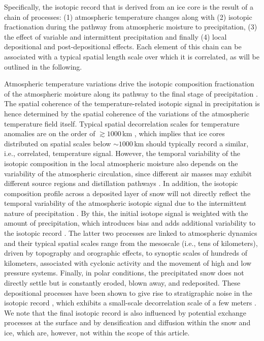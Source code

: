 \documentclass[draft]{agujournal2019}
\begin{document}
Specifically, the isotopic record that is derived from an ice core is the result
of a chain of processes: (1) atmospheric temperature changes along with (2) isotopic
fractionation during the pathway from atmospheric moisture to precipitation, (3)
the effect of variable and intermittent precipitation and finally (4) local
depositional and post-depositional effects. Each element of this chain can be
associated with a typical spatial length scale over which it is correlated, as
will be outlined in the following.

Atmospheric temperature variations drive the isotopic composition fractionation
of the atmospheric moisture along its pathway to the final stage of
precipitation \cite{Dansgaard1964,Jouzel1984}. The spatial coherence of the
temperature-related isotopic signal in precipitation is hence determined by the
spatial coherence of the variations of the atmospheric temperature field
itself. Typical spatial decorrelation scales for temperature anomalies are on
the order of $\gtrsim1000$\,km \cite{Jones1997}, which implies that ice cores
distributed on spatial scales below $\sim 1000$\,km should typically record a
similar, i.e., correlated, temperature signal. However, the temporal variability
of the isotopic composition in the local atmospheric moisture also depends on
the variability of the atmospheric circulation, since different air masses may
exhibit different source regions and distillation pathways \cite{Schlosser2004,
Sodemann2008a,Birks2009,Kuttel2012}. In addition, the isotopic composition
profile across a deposited layer of snow will not directly reflect the temporal
variability of the atmospheric isotopic signal due to the intermittent nature of
precipitation \cite{Schleiss2015}. By this, the initial isotope signal is
weighted with the amount of precipitation, which introduces bias
\cite{Steig1994,Laepple2011a} and adds additional variability to the isotopic
record \cite{Persson2011,Casado2020}. The latter two processes are linked to
atmospheric dynamics and their typical spatial scales range from the mesoscale
(i.e., tens of kilometers), driven by topography and orographic effects, to
synoptic scales of hundreds of kilometers, associated with cyclonic activity and
the movement of high and low pressure systems. Finally, in polar conditions, the
precipitated snow does not directly settle but is constantly eroded, blown away,
and redeposited. These depositional processes have been shown to give rise to
stratigraphic noise in the isotopic record
\cite{Fisher1985,Munch2016,Laepple2016}, which exhibits a small-scale
decorrelation scale of a few meters \cite{Munch2016}. We note that the final
isotopic record is also influenced by potential exchange processes at the
surface and by densification and diffusion within the snow and ice, which are,
however, not within the scope of this article.
\end{document}

